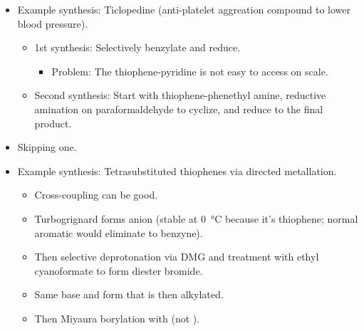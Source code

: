 \documentclass[../notes.tex]{subfiles}
\begin{document}
\begin{itemize}
\begin{itemize}
\begin{itemize}
            \item Yield is bad, Sandmeyer uses a hazardous reagent, silylation at $-\SI{70}{\celsius}$, preparation of acid chloride causes 20\% protodesilylation.
        \end{itemize}
        \item Need to make rapid \SI{20}{\kilo\gram} and up to \SI{200}{\kilo\gram} batches.
        \begin{itemize}
            \item Solution: Wash out the unused material (30-40\% loss isn't environmentally good, but it can be good cost-wise).
        \end{itemize}
        \item To make even better, they went the cheating route: $\alpha$-chloro material.
    \end{itemize}
    \item Example synthesis: Ticlopedine (anti-platelet aggreation compound to lower blood pressure).
    \begin{itemize}
        \item 1st synthesis: Selectively benzylate and reduce.
        \begin{itemize}
            \item Problem: The thiophene-pyridine is not easy to access on scale.
        \end{itemize}
        \item Second synthesis: Start with thiophene-phenethyl amine, reductive amination on paraformaldehyde to cyclize, and reduce to the final product.
    \end{itemize}
    \item Skipping one.
    \item Example synthesis: Tetrasubstituted thiophenes via directed metallation.
    \begin{itemize}
        \item Cross-coupling can be good.
        \item Turbogrignard forms anion (stable at \SI{0}{\celsius} because it's thiophene; normal aromatic would eliminate to benzyne).
        \item Then selective deprotonation via DMG and treatment with ethyl cyanoformate to form diester bromide.
        \item Same base and  form  that is then alkylated.
        \item Then Miyaura borylation with  (not ).

\end{itemize}
\end{itemize}
\end{document}
